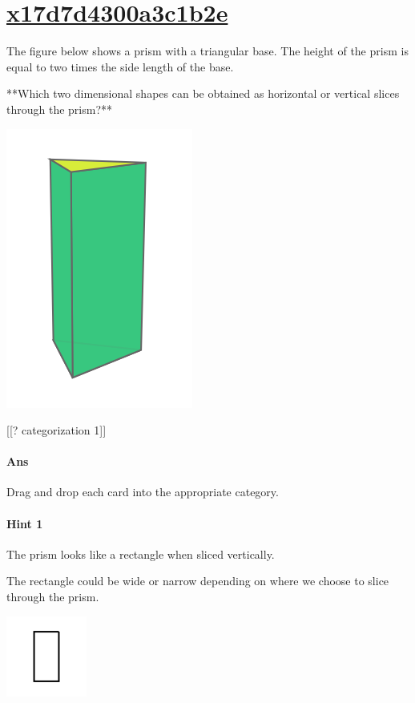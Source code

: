 \documentclass[twocolumn,10pt]{article}
\def\shrinkfactor{0.4}
\begin{document}
\section{\href{https://www.khanacademy.org/devadmin/content/items/x17d7d4300a3c1b2e}{x17d7d4300a3c1b2e}}

\noindent
The figure below shows a prism with a triangular base. The height of the prism is equal to two times the side length of the base. 

**Which two dimensional shapes can be obtained as  horizontal or vertical slices through the prism?**  


\includegraphics[scale=\shrinkfactor]{figures/bc0dd6be76a7e7e42d7bc2db7a75bc30a90d3b83.png}

[[? categorization 1]]

\paragraph{Ans} Drag and drop each card into the appropriate category. 

\paragraph{Hint 1}The prism looks like a rectangle when sliced vertically.

The rectangle could be wide or narrow depending on where we choose to slice through the prism.


\includegraphics[scale=\shrinkfactor]{figures/225bc3d058cebe2059fc56f78ef80b5f3e0f2da7.png} 
\end{document}
